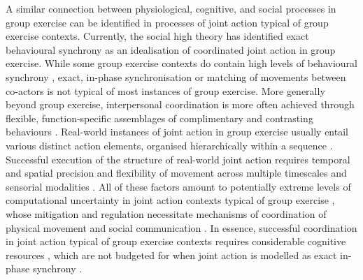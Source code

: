 \begin{CJK}{UTF8}{gbsn}
A similar connection between physiological, cognitive, and social processes in group exercise can be identified in processes of joint action typical of group exercise contexts.  Currently, the social high theory has identified exact behavioural synchrony as an idealisation of coordinated joint action in group exercise.  While some group exercise contexts do contain high levels of behavioural synchrony \citep[rowing, synchronised swimming, diving, mass calisthenics, and forms of dance such as ballet, see][]{McNeill1995}, exact, in-phase synchronisation or matching of movements between co-actors is not typical of most instances of group exercise.  More generally beyond group exercise, interpersonal coordination is more often achieved through flexible, function-specific assemblages of complimentary and contrasting behaviours \citep[for example, coordination in an interactional team sport, a dyadic conversation, or an ensemble music performance, see][]{Fusaroli2014}.  Real-world instances of joint action in group exercise usually entail various distinct action elements, organised hierarchically within a sequence \citep{Schmidt1975,Rosenbaum2009}.  Successful execution of the structure of real-world joint action requires temporal and spatial precision and flexibility of movement across multiple timescales and sensorial modalities \citep{Sebanz2006,Pacherie2012}.
All of these factors amount to potentially extreme levels of computational uncertainty in joint action contexts typical of group exercise \citep{Bernstein1967}, whose mitigation and regulation necessitate mechanisms of coordination of physical movement and social communication \citep{Turvey1978}.  In essence, successful coordination in joint action typical of group exercise contexts requires considerable cognitive resources \citep{Turvey1978}, which are not budgeted for when joint action is modelled as exact in-phase synchrony \citep{Keller2014}.




\end{CJK}
